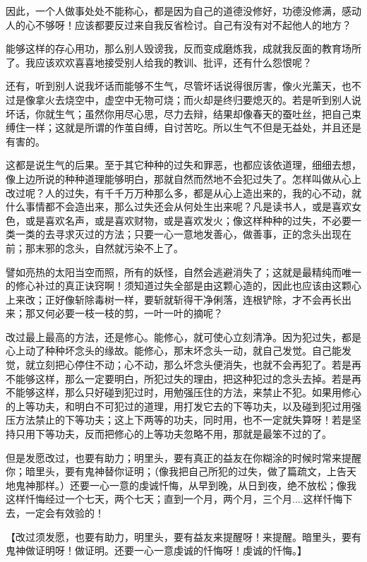 \documentclass[12pt,twoside,openany]{book}
\newcommand{\kai}[1]{{\CJKfamily{kai}#1}}
\begin{document}
因此，一个人做事处处不能称心，都是因为自己的道德没修好，功德没修满，感动人的心不够呀！应该都要反过来自我反省检讨。自己有没有对不起他人的地方？

能够这样的存心用功，那么别人毁谤我，反而变成磨炼我，成就我反面的教育场所了。我应该欢欢喜喜地接受别人给我的教训、批评，还有什么怨恨呢？

还有，听到别人说我坏话而能够不生气，尽管坏话说得很厉害，像火光薰天，也不过是像拿火去烧空中，虚空中无物可烧；而火却是终归要熄灭的。若是听到别人说坏话，你就生气；虽然你用尽心思，尽力去辩，结果却像春天的蚕吐丝，把自己束缚住一样；这就是所谓的作茧自缚，自讨苦吃。所以生气不但是无益处，并且还是有害的。

这都是说生气的后果。至于其它种种的过失和罪恶，也都应该依道理，细细去想，像上边所说的种种道理能够明白，那就自然而然地不会犯过失了。怎样叫做从心上改过呢？人的过失，有千千万万种那么多，都是从心上造出来的，我的心不动，就什么事情都不会造出来，那么过失还会从何处生出来呢？凡是读书人，或是喜欢女色，或是喜欢名声，或是喜欢财物，或是喜欢发火；像这样种种的过失，不必要一类一类的去寻求灭过的方法；只要一心一意地发善心，做善事，正的念头出现在前；那末邪的念头，自然就污染不上了。

譬如亮热的太阳当空而照，所有的妖怪，自然会逃避消失了；这就是最精纯而唯一的修心补过的真正诀窍啊！须知道过失全部是由这颗心造的，因此也应该由这颗心上来改；正好像斩除毒树一样，要斩就斩得干净俐落，连根铲除，才不会再长出来；那又何必要一枝一枝的剪，一叶一叶的摘呢？

改过最上最高的方法，还是修心。能修心，就可使心立刻清净。因为犯过失，都是心上动了种种坏念头的缘故。能修心，那末坏念头一动，就自己发觉。自己能发觉，就立刻把心停住不动；心不动，那么坏念头便消失，也就不会再犯了。若是再不能够这样，那么一定要明白，所犯过失的理由，把这种犯过的念头去掉。若是再不能够这样，那么只好碰到犯过时，用勉强压住的方法，来禁止不犯。如果用修心的上等功夫，和明白不可犯过的道理，用打发它去的下等功夫，以及碰到犯过用强压方法禁止的下等功夫；这上下两等的功夫，同时用，也不一定就失算呀！若是坚持只用下等功夫，反而把修心的上等功夫忽略不用，那就是最笨不过的了。

但是发愿改过，也要有助力；明里头，要有真正的益友在你糊涂的时候时常来提醒你；暗里头，要有鬼神替你证明；（像我把自己所犯的过失，做了篇疏文，上告天地鬼神那样。）还要一心一意的虔诚忏悔，从早到晚，从日到夜，绝不放松；像我这样忏悔经过一个七天，两个七天；直到一个月，两个月，三个月....这样忏悔下去，一定会有效验的！

【\kai{改过须发愿，也要有助力，明里头，要有益友来提醒呀！来提醒。暗里头，要有鬼神做证明呀！做证明。还要一心一意虔诚的忏悔呀！虔诚的忏悔。}】
\end{document}
